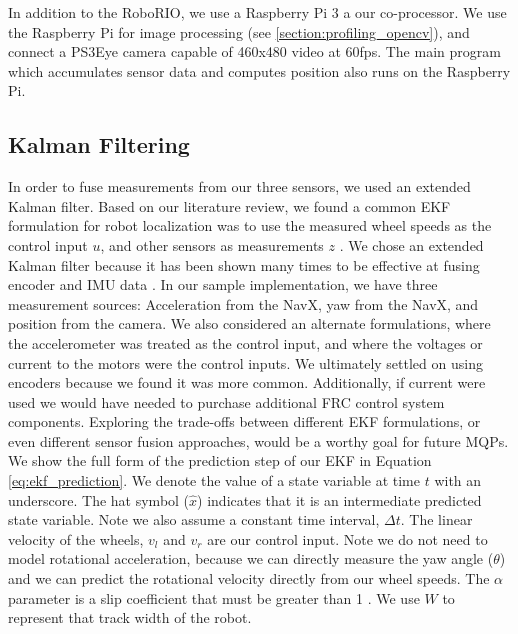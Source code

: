 \documentclass{article}
\begin{document}
    In addition to the RoboRIO, we use a Raspberry Pi 3 a our co-processor. We use the Raspberry Pi for image processing (see \ref{section:profiling_opencv}), and connect a PS3Eye camera capable of 460x480 video at 60fps. The main program which accumulates sensor data and computes position also runs on the Raspberry Pi.

	\subsection{Kalman Filtering}

    In order to fuse measurements from our three sensors, we used an extended Kalman filter. Based on our literature review, we found a common EKF formulation for robot localization was to use the measured wheel speeds as the control input $u$, and other sensors as measurements $z$ \cite{thrun_probabilistic_2005}. We chose an extended Kalman filter because it has been shown many times to be effective at fusing encoder and IMU data \cite{marin_multi_2013}\cite{teslic_ekf-based_2011}\cite{thrun_probabilistic_2005}. In our sample implementation, we have three measurement sources: Acceleration from the NavX, yaw from the NavX, and position from the camera. We also considered an alternate formulations, where the accelerometer was treated as the control input, and where the voltages or current to the motors were the control inputs. We ultimately settled on using encoders because we found it was more common. Additionally, if current were used we would have needed to purchase additional FRC control system components. Exploring the trade-offs between different EKF formulations, or even different sensor fusion approaches, would be a worthy goal for future MQPs. We show the full form of the prediction step of our EKF in Equation \ref{eq:ekf_prediction}. We denote the value of a state variable at time $t$ with an underscore. The hat symbol ($\hat{x}$) indicates that it is an intermediate predicted state variable. Note we also assume a constant time interval, $\Delta t$. The linear velocity of the wheels, $v_l$ and $v_r$ are our control input. Note we do not need to model rotational acceleration, because we can directly measure the yaw angle ($\theta$) and we can predict the rotational velocity directly from our wheel speeds. The $\alpha$ parameter is a slip coefficient that must be greater than 1 \cite{yu_dynamic_2011}. We use $W$ to represent that track width of the robot.
\end{document}
